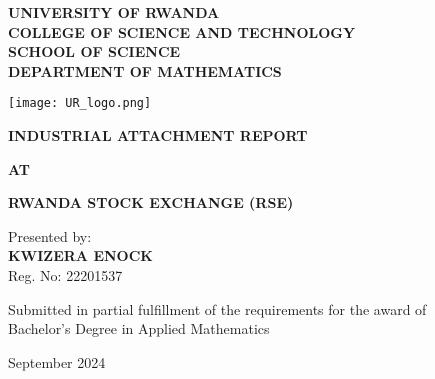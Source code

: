 \documentclass{article}
\begin{document}
\begin{titlepage}
\begin{center}
{\Large \textbf{UNIVERSITY OF RWANDA}}\\
\vspace{0.5cm}
{\Large \textbf{COLLEGE OF SCIENCE AND TECHNOLOGY}}\\
\vspace{0.5cm}
{\Large \textbf{SCHOOL OF SCIENCE}}\\
\vspace{0.5cm}
{\Large \textbf{DEPARTMENT OF MATHEMATICS}}\\
\vspace{2cm}

\texttt{[image: UR\_logo.png]}\\
\vspace{2cm}

{\Large \textbf{INDUSTRIAL ATTACHMENT REPORT}}\\
\vspace{1cm}

{\Large \textbf{AT}}\\
\vspace{1cm}

{\Large \textbf{RWANDA STOCK EXCHANGE (RSE)}}\\
\vspace{2cm}

{\large Presented by:}\\
{\Large \textbf{KWIZERA ENOCK}}\\
{\large Reg. No: 22201537}\\
\vspace{1.5cm}

{\large Submitted in partial fulfillment of the requirements for the award of}\\
{\large Bachelor's Degree in Applied Mathematics}\\
\vspace{2cm}

{\large September 2024}
\end{center}
\end{titlepage}
\end{document}

